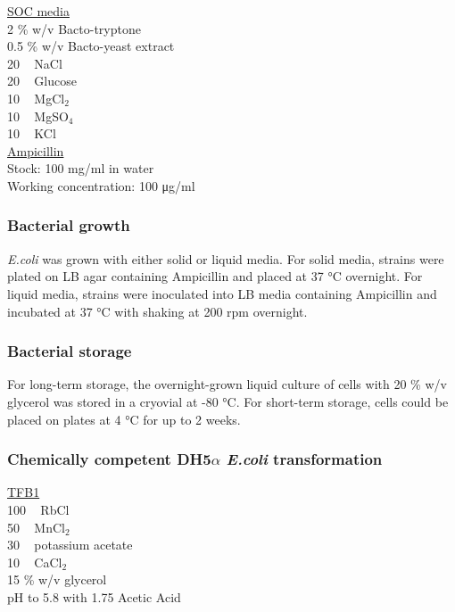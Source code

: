 \underline{SOC media}\\
2 \% w/v Bacto-tryptone \\ 
0.5 \% w/v Bacto-yeast extract \\ 
20 \si{\milli\Molar} NaCl \\
20 \si{\milli\Molar} Glucose \\
10 \si{\milli\Molar} MgCl$_{2}$ \\
10 \si{\milli\Molar} MgSO$_{4}$ \\
10 \si{\milli\Molar} KCl \\

\underline{Ampicillin}\\
Stock: 100 \si{\milli\gram/\milli\litre} in water \\
Working concentration: 100 \si{\micro\gram/\milli\litre} 


\subsubsection{Bacterial growth}
\textit{E.coli} was grown with either solid or liquid media. For solid media, strains were plated on LB agar containing Ampicillin and placed at 37 \si{\celsius} overnight. For liquid media, strains were inoculated into LB media containing Ampicillin and incubated at 37 \si{\celsius} with shaking at 200 rpm overnight. 

\subsubsection{Bacterial storage}
For long-term storage, the overnight-grown liquid culture of cells with 20 \% w/v glycerol was stored in a cryovial at -80 \si{\celsius}. For short-term storage, cells could be placed on plates at 4 \si{\celsius} for up to 2 weeks. 

\subsubsection{Chemically competent DH5$\alpha$ \textit{E.coli} transformation}
\underline{TFB1} \\
100 \si{\milli\Molar} RbCl \\
50 \si{\milli\Molar} MnCl$_{2}$ \\ 
30 \si{\milli\Molar} potassium acetate\\
10 \si{\milli\Molar} CaCl$_{2}$\\
15 \% w/v glycerol\\
pH to 5.8 with 1.75 \si{\Molar} Acetic Acid\\

